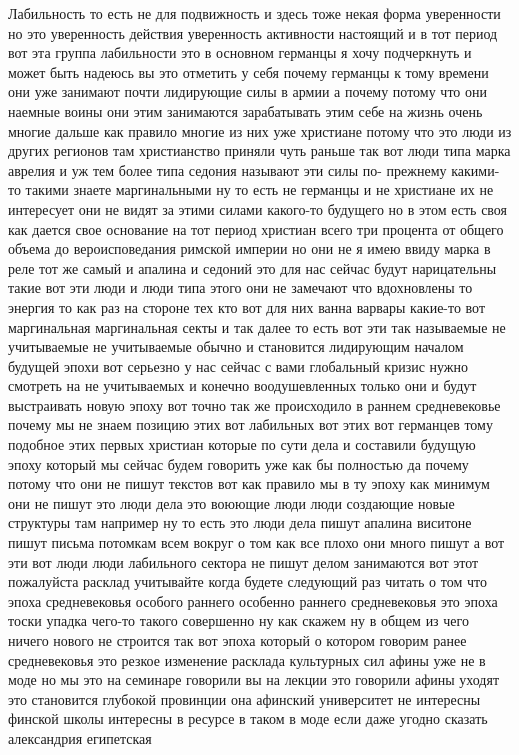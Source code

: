 Лабильность то есть не
для подвижность и здесь тоже некая форма уверенности но это уверенность действия
уверенность активности настоящий и в тот период вот эта группа лабильности это
в основном германцы я хочу подчеркнуть и может быть надеюсь вы это отметить у
себя почему германцы к тому времени они уже занимают почти лидирующие силы в
армии а почему потому что они наемные воины они этим занимаются зарабатывать
этим себе на жизнь очень многие дальше как правило многие из них уже христиане
потому что это люди из других регионов там христианство приняли чуть раньше так
вот люди типа марка аврелия и уж тем более типа седония называют эти силы по-
прежнему какими-то такими знаете маргинальными ну то есть не германцы и не
христиане их не интересует они не видят за этими силами какого-то будущего но в
этом есть своя как дается свое основание на тот период христиан всего три
процента от общего объема до вероисповедания римской империи но они не я имею
ввиду марка в реле тот же самый и апалина и седоний это для нас сейчас будут
нарицательны такие вот эти люди и люди типа этого они не замечают что
вдохновлены то энергия то как раз на стороне тех кто вот для них ванна варвары
какие-то вот маргинальная маргинальная секты и так далее то есть вот эти так
называемые не учитываемые не учитываемые обычно и становится лидирующим началом
будущей эпохи вот серьезно у нас сейчас с вами глобальный кризис нужно смотреть
на не учитываемых и конечно воодушевленных только они и будут выстраивать новую
эпоху вот точно так же происходило в раннем средневековье почему мы не знаем
позицию этих вот лабильных вот этих вот германцев тому подобное этих первых
христиан которые по сути дела и составили будущую эпоху который мы сейчас будем
говорить уже как бы полностью да почему потому что они не пишут текстов вот как
правило мы в ту эпоху как минимум они не пишут это люди дела это воюющие люди
люди создающие новые структуры там например ну то есть это люди дела пишут
апалина виситоне пишут письма потомкам всем вокруг о том как все плохо они много
пишут а вот эти вот люди люди лабильного сектора не пишут делом занимаются вот
этот пожалуйста расклад учитывайте когда будете следующий раз читать о том что
эпоха средневековья особого раннего особенно раннего средневековья это эпоха
тоски упадка чего-то такого совершенно ну как скажем ну в общем из чего ничего
нового не строится так вот эпоха который о котором говорим ранее средневековья
это резкое изменение расклада культурных сил афины уже не в моде но мы это на
семинаре говорили вы на лекции это говорили афины уходят это становится глубокой
провинции она афинский университет не интересны финской школы интересны в
ресурсе в таком в моде если даже угодно сказать александрия египетская 

